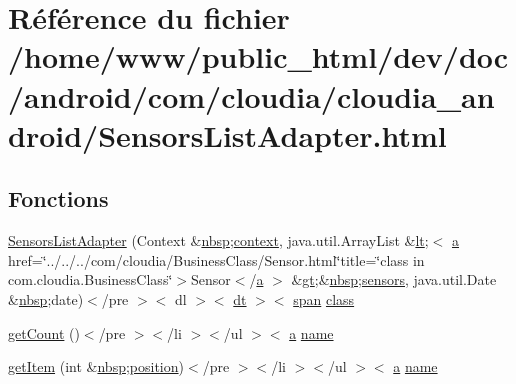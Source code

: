 \hypertarget{_sensors_list_adapter_8html}{\section{Référence du fichier /home/www/public\-\_\-html/dev/doc/android/com/cloudia/cloudia\-\_\-android/\-Sensors\-List\-Adapter.html}
\label{_sensors_list_adapter_8html}
}
\subsection*{Fonctions}
\begin{DoxyCompactItemize}
\item 
\hyperlink{_sensors_list_adapter_8html_a262531727b33a47b2d2de82aae1a9f6c}{Sensors\-List\-Adapter} (Context \&\hyperlink{_tools_8html_aef915316f784c9063d942974538301a6}{nbsp};\hyperlink{_stations_list_adapter_8html_a261f9f58ccbeaa962c4e675e4212c9cc}{context}, java.\-util.\-Array\-List \&\hyperlink{overview-tree_8html_aac3322e12d911341c3d470b46b2d80f4}{lt};$<$ \hyperlink{style_8css_a5e8981582017bb8b84c21f148345d1f7}{a} href=\char`\"{}../../../com/cloudia/Business\-Class/Sensor.\-html\char`\"{}title=\char`\"{}class in com.\-cloudia.\-Business\-Class\char`\"{}$>$Sensor$<$/\hyperlink{style_8css_a5e8981582017bb8b84c21f148345d1f7}{a} $>$ \&\hyperlink{overview-tree_8html_a1bb4447113f0bd7bf49e2b3dee2e065d}{gt};\&\hyperlink{_tools_8html_aef915316f784c9063d942974538301a6}{nbsp};\hyperlink{index_8js_ab303494f0145e9670904021fa3e4714d}{sensors}, java.\-util.\-Date \&\hyperlink{_tools_8html_aef915316f784c9063d942974538301a6}{nbsp};date)$<$/pre $>$$<$ dl $>$$<$ \hyperlink{stylesheet_8css_a107565fb4039d33b041380d6e0ea1d80}{dt} $>$$<$ \hyperlink{stylesheet_8css_a8343996ebcf16220b04e54659aac31cc}{span} \hyperlink{_tools_8html_acf06f836132665ba8114f5a414c2403f}{class}
\item 
\hyperlink{_sensors_list_adapter_8html_ae525147b24808ba1614a2ebdba04b92b}{get\-Count} ()$<$/pre $>$$<$/li $>$$<$/ul $>$$<$ \hyperlink{style_8css_a5e8981582017bb8b84c21f148345d1f7}{a} \hyperlink{_cloudia_d_b_8html_ab74e6bf80237ddc4109968cedc58c151}{name}
\item 
\hyperlink{_sensors_list_adapter_8html_acf501ac8c326886f176c7537b25b50c2}{get\-Item} (int \&\hyperlink{_tools_8html_aef915316f784c9063d942974538301a6}{nbsp};\hyperlink{_stations_list_adapter_8html_a7130b1618285588513fd1ff97884b9d9}{position})$<$/pre $>$$<$/li $>$$<$/ul $>$$<$ \hyperlink{style_8css_a5e8981582017bb8b84c21f148345d1f7}{a} \hyperlink{_cloudia_d_b_8html_ab74e6bf80237ddc4109968cedc58c151}{name}
$$
\end{DoxyCompactItemize}
